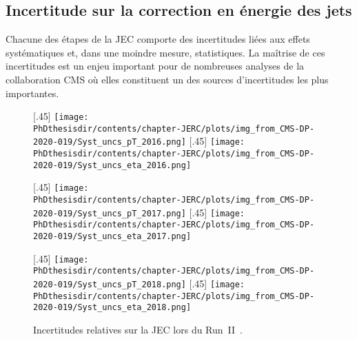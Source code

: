 \subsection{Incertitude sur la correction en énergie des jets}\label{chapter-JERC-section-CMS-subsec-unc}
Chacune des étapes de la JEC comporte des incertitudes liées aux effets systématiques et, dans une moindre mesure, statistiques.
La maîtrise de ces incertitudes est un enjeu important pour de nombreuses analyses de la collaboration CMS où elles constituent un des sources d'incertitudes les plus importantes.
\begin{figure}[p]
\centering
{}[.45\textwidth]
{\texttt{[image: \\PhDthesisdir/contents/chapter-JERC/plots/img\_from\_CMS-DP-2020-019/Syst\_uncs\_pT\_2016.png]}\vspace{-.5\baselineskip}}
\hfill
{}[.45\textwidth]
{\texttt{[image: \\PhDthesisdir/contents/chapter-JERC/plots/img\_from\_CMS-DP-2020-019/Syst\_uncs\_eta\_2016.png]}\vspace{-.5\baselineskip}}

\vspace{.75\baselineskip}

[.45\textwidth]
{\texttt{[image: \\PhDthesisdir/contents/chapter-JERC/plots/img\_from\_CMS-DP-2020-019/Syst\_uncs\_pT\_2017.png]}\vspace{-.5\baselineskip}}
\hfill
{}[.45\textwidth]
{\texttt{[image: \\PhDthesisdir/contents/chapter-JERC/plots/img\_from\_CMS-DP-2020-019/Syst\_uncs\_eta\_2017.png]}\vspace{-.5\baselineskip}}

\vspace{.75\baselineskip}

[.45\textwidth]
{\texttt{[image: \\PhDthesisdir/contents/chapter-JERC/plots/img\_from\_CMS-DP-2020-019/Syst\_uncs\_pT\_2018.png]}\vspace{-.5\baselineskip}}
\hfill
{}[.45\textwidth]
{\texttt{[image: \\PhDthesisdir/contents/chapter-JERC/plots/img\_from\_CMS-DP-2020-019/Syst\_uncs\_eta\_2018.png]}\vspace{-.5\baselineskip}}

\caption[Incertitudes relatives sur la JEC en fonction de \pT\ et $\eta$ lors du Run~II.]{Incertitudes relatives sur la JEC lors du Run~II~\cite{CMS-DP-2020-019}.}
\label{fig-Syst_uncs_JEC_RunII}
\end{figure}
